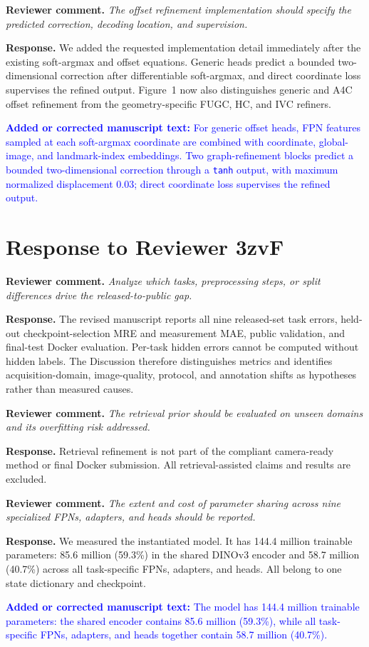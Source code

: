 \documentclass[11pt]{article}
\newcommand{\reviewcomment}[1]{\par\noindent\textbf{Reviewer comment.} \emph{#1}\par}
\newcommand{\response}[1]{\par\noindent\textbf{Response.} #1\par}
\newcommand{\manuscriptchange}[1]{\par\smallskip\noindent\textcolor{blue}{\textbf{Added or corrected manuscript text:} #1}\par\smallskip}
\begin{document}
\reviewcomment{The offset refinement implementation should specify the predicted correction, decoding location, and supervision.}
\response{We added the requested implementation detail immediately after the existing soft-argmax and offset equations. Generic heads predict a bounded two-dimensional correction after differentiable soft-argmax, and direct coordinate loss supervises the refined output. Figure~1 now also distinguishes generic and A4C offset refinement from the geometry-specific FUGC, HC, and IVC refiners.}

\manuscriptchange{For generic offset heads, FPN features sampled at each soft-argmax coordinate are combined with coordinate, global-image, and landmark-index embeddings. Two graph-refinement blocks predict a bounded two-dimensional correction through a \texttt{tanh} output, with maximum normalized displacement 0.03; direct coordinate loss supervises the refined output.}

\section*{Response to Reviewer 3zvF}

\reviewcomment{Analyze which tasks, preprocessing steps, or split differences drive the released-to-public gap.}
\response{The revised manuscript reports all nine released-set task errors, held-out checkpoint-selection MRE and measurement MAE, public validation, and final-test Docker evaluation. Per-task hidden errors cannot be computed without hidden labels. The Discussion therefore distinguishes metrics and identifies acquisition-domain, image-quality, protocol, and annotation shifts as hypotheses rather than measured causes.}

\reviewcomment{The retrieval prior should be evaluated on unseen domains and its overfitting risk addressed.}
\response{Retrieval refinement is not part of the compliant camera-ready method or final Docker submission. All retrieval-assisted claims and results are excluded.}

\reviewcomment{The extent and cost of parameter sharing across nine specialized FPNs, adapters, and heads should be reported.}
\response{We measured the instantiated model. It has 144.4 million trainable parameters: 85.6 million (59.3\%) in the shared DINOv3 encoder and 58.7 million (40.7\%) across all task-specific FPNs, adapters, and heads. All belong to one state dictionary and checkpoint.}

\manuscriptchange{The model has 144.4 million trainable parameters: the shared encoder contains 85.6 million (59.3\%), while all task-specific FPNs, adapters, and heads together contain 58.7 million (40.7\%).}
\end{document}
